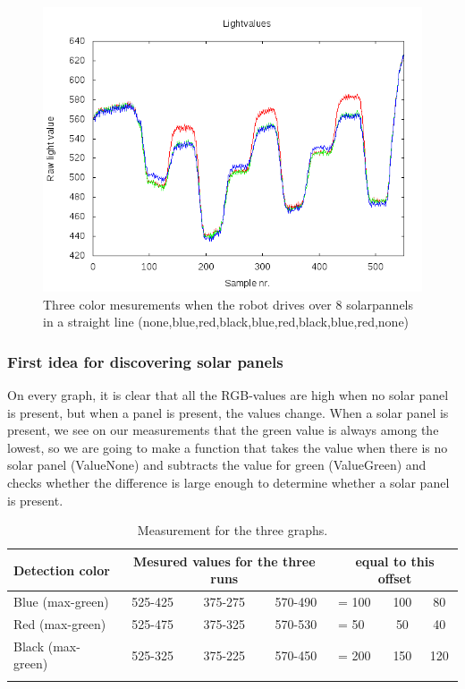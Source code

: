 \begin{figure}[hbt]
  \includegraphics[scale=0.35]{../experiments/2prototype/results/gnuplot/Colormesrun3.png}
  \caption{Three color mesurements when the robot drives over 8 solarpannels in a
straight line (none,blue,red,black,blue,red,black,blue,red,none)}
\end{figure}
\subsubsection{First idea for discovering solar panels}

On every graph, it is clear that all the RGB-values are high when no
solar panel is present, but when a panel is present, the values change.
When a solar panel is present, we see on our measurements that the green
value is always among the lowest, so we are going to make a function
that takes the value when there is no solar panel (ValueNone) and
subtracts the value for green (ValueGreen) and checks whether the
difference is large enough to determine whether a solar panel is
present.


\begin{longtable}[chtp]{|l|c|c|c|l|c|c|}
\hline
Detection color & 
\multicolumn{3}{c|}{Mesured values for the three runs} &
\multicolumn{3}{c|}{equal to this offset}\\\hline 
Blue (max-green) & 525-425 & 375-275 & 570-490 &= 100 & 100 & 80 \\
Red (max-green)  & 525-475 & 375-325 & 570-530 &=  50 &  50 & 40 \\
Black (max-green)& 525-325 & 375-225 & 570-450 &= 200 & 150 &120\\
\hline
\caption{Measurement for the three graphs.}
\end{longtable}


